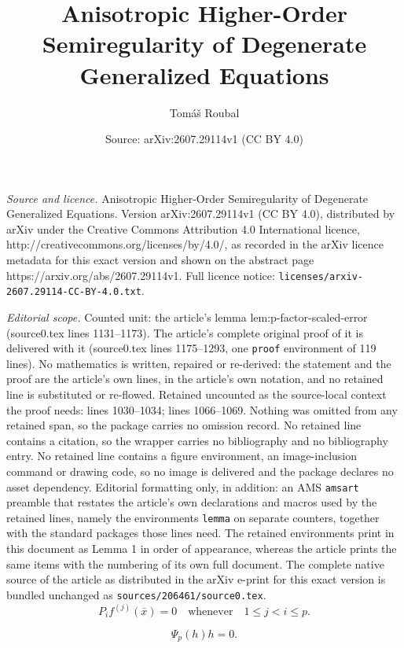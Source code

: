 \documentclass[10pt,a4paper]{amsart}
\title{Anisotropic Higher-Order Semiregularity of Degenerate Generalized Equations}
\author{Tom\'a\v{s} Roubal}
\date{Source: arXiv:2607.29114v1 (CC BY 4.0)}
\newcommand{\bx}{\bar x}
\begin{document}
\maketitle

\noindent\emph{Source and licence.} Anisotropic Higher-Order Semiregularity of Degenerate Generalized Equations. Version arXiv:2607.29114v1 (CC BY 4.0), distributed by arXiv under the Creative Commons Attribution 4.0 International licence, http://creativecommons.org/licenses/by/4.0/, as recorded in the arXiv licence metadata for this exact version and shown on the abstract page https://arxiv.org/abs/2607.29114v1. Full licence notice: \texttt{licenses/arxiv-2607.29114-CC-BY-4.0.txt}.\par\smallskip

\noindent\textit{Editorial scope.} Counted unit: the article's lemma lem:p-factor-scaled-error (source0.tex lines 1131--1173). The article's complete original proof of it is delivered with it (source0.tex lines 1175--1293, one \texttt{proof} environment of 119 lines). No mathematics is written, repaired or re-derived: the statement and the proof are the article's own lines, in the article's own notation, and no retained line is substituted or re-flowed.  Retained uncounted as the source-local context the proof needs: lines 1030--1034; lines 1066--1069.  Nothing was omitted from any retained span, so the package carries no omission record.  No retained line contains a citation, so the wrapper carries no bibliography and no bibliography entry.  No retained line contains a figure environment, an image-inclusion command or drawing code, so no image is delivered and the package declares no asset dependency.  Editorial formatting only, in addition: an AMS \texttt{amsart} preamble that restates the article's own declarations and macros used by the retained lines, namely the environments \texttt{lemma} on separate counters, together with the standard packages those lines need.  The retained environments print in this document as Lemma 1 in order of appearance, whereas the article prints the same items with the numbering of its own full document.  The complete native source of the article as distributed in the arXiv e-print for this exact version is bundled unchanged as \texttt{sources/206461/source0.tex}.
	\begin{equation}
		P_i f^{(j)}(\bx)=0
		\quad\text{whenever}\quad 1\le j<i\le p.
		\label{eq:P1}
	\end{equation}

	\begin{equation}
		\Psi_p(h)h=0.
		\label{eq:P4}
	\end{equation}
\end{document}
